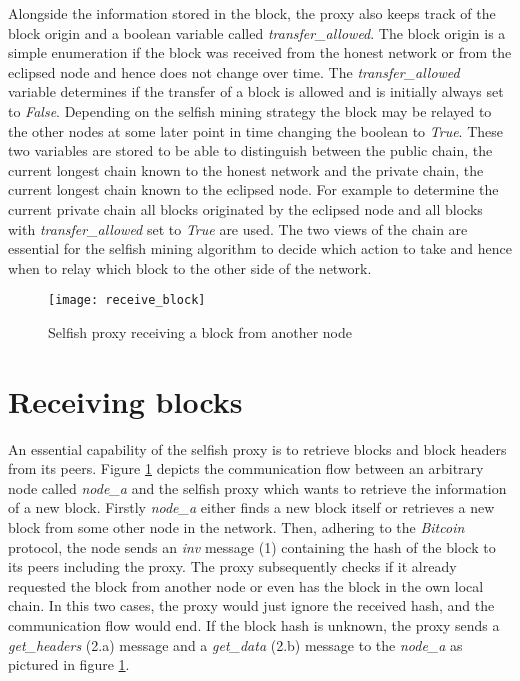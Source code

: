 Alongside the information stored in the block, the proxy also keeps track of the block origin and a boolean variable called \textit{transfer\_allowed}. 
The block origin is a simple enumeration if the block was received from the honest network or from the eclipsed node and hence does not change over time.
The \textit{transfer\_allowed} variable determines if the transfer of a block is allowed and is initially always set to \textit{False}.
Depending on the selfish mining strategy the block may be relayed to the other nodes at some later point in time changing the boolean to \textit{True}.
These two variables are stored to be able to distinguish between the public chain, the current longest chain known to the honest network and the private chain, the current longest chain known to  the eclipsed node.
For example to determine the current private chain all blocks originated by the eclipsed node and all blocks with \textit{transfer\_allowed} set to \textit{True} are used.
The two views of the chain are essential for the selfish mining algorithm to decide which action to take and hence when to relay which block to the other side of the network.

\begin{figure}
	\centering
    \texttt{[image: receive\_block]}
    \caption{Selfish proxy receiving a block from another node}
    \label{fig:receive_block}
\end{figure}

\section{Receiving blocks}
\label{chap:receiving_blocks}

An essential capability of the selfish proxy is to retrieve blocks and block headers from its peers.
Figure \ref{fig:receive_block} depicts the communication flow between an arbitrary node called \textit{node\_a} and the selfish proxy which wants to retrieve the information of a new block.
Firstly \textit{node\_a} either finds a new block itself or retrieves a new block from some other node in the network.
Then, adhering to the \textit{Bitcoin} protocol, the node sends an \textit{inv} message (1) containing the hash of the block to its peers including the proxy.
The proxy subsequently checks if it already requested the block from another node or even has the block in the own local chain.
In this two cases, the proxy would just ignore the received hash, and the communication flow would end.
If the block hash is unknown, the proxy sends a \textit{get\_headers} (2.a) message and a \textit{get\_data} (2.b) message to the \textit{node\_a} as pictured in figure \ref{fig:receive_block}.

